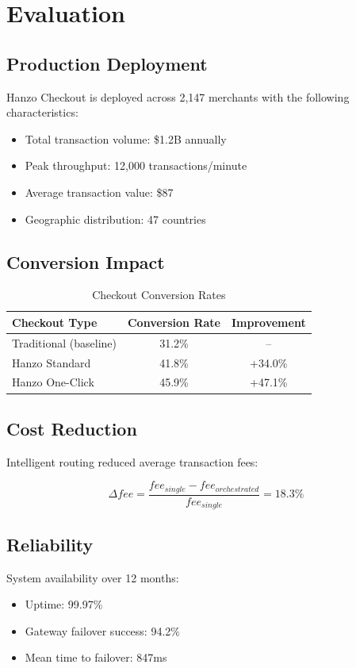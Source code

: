 \section{Evaluation}


\subsection{Production Deployment}

Hanzo Checkout is deployed across 2,147 merchants with the following characteristics:

\begin{itemize}
    \item Total transaction volume: \$1.2B annually
    \item Peak throughput: 12,000 transactions/minute
    \item Average transaction value: \$87
    \item Geographic distribution: 47 countries
\end{itemize}

\subsection{Conversion Impact}

\begin{table}[h]
\centering
\caption{Checkout Conversion Rates}
\begin{tabular}{lcc}
\toprule
\textbf{Checkout Type} & \textbf{Conversion Rate} & \textbf{Improvement} \\
\midrule
Traditional (baseline) & 31.2\% & -- \\
Hanzo Standard & 41.8\% & +34.0\% \\
Hanzo One-Click & 45.9\% & +47.1\% \\
\bottomrule
\end{tabular}
\end{table}

\subsection{Cost Reduction}

Intelligent routing reduced average transaction fees:

\begin{equation}
\Delta fee = \frac{fee_{single} - fee_{orchestrated}}{fee_{single}} = 18.3\%
\end{equation}

\subsection{Reliability}

System availability over 12 months:

\begin{itemize}
    \item Uptime: 99.97\%
    \item Gateway failover success: 94.2\%
    \item Mean time to failover: 847ms
\end{itemize}

